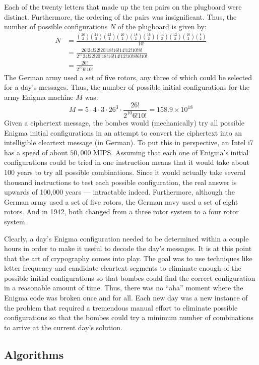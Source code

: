 Each of the twenty letters that made up the ten pairs on the plugboard were distinct.  Furthermore, the ordering of
the pairs was insignificant. Thus, the number of possible configurations \(N\) of the plugboard is given by:
\begin{align*}
  N &= \frac{\binom{26}{2}\binom{24}{2}\binom{22}{2}\binom{20}{2}\binom{18}{2}
  \binom{16}{2}\binom{14}{2}\binom{12}{2}\binom{10}{2}\binom{8}{2}}{10!} \\
  &=\frac{26!24!22!20!18!16!14!12!10!8!}{2^{10}24!22!20!18!16!14!12!10!8!6!10!} \\
  &=\frac{26!}{2^{10}6!10!}
\end{align*}
The German army used a set of five rotors, any three of which could be selected for a day's messages.  Thus, the
number of possible initial configurations for the army Enigma machine \(M\) was:
\[M=5\cdot4\cdot3\cdot26^3\cdot\frac{26!}{2^{10}6!10!}=158.9\times10^{18}\]
Given a ciphertext message, the bombes would (mechanically) try all possible Enigma initial configurations in an
attempt to convert the ciphertext into an intelligible cleartext message (in German).  To put this in perspective,
an Intel i7 has a speed of about \(50,000\) MIPS.  Assuming that each one of Enigma's initial configurations could
be tried in one instruction means that it would take about 100 years to try all possible combinations.  Since it
would actually take several thousand instructions to test each possible configuration, the real answer is upwards
of 100,000 years --- intractable indeed.  Furthermore, although the German army used a set of five rotors, the German
navy used a set of eight rotors.  And in 1942, both changed from a three rotor system to a four rotor system.

Clearly, a day's Enigma configuration needed to be determined within a couple hours in order to make it useful to
decode the day's messages.  It is at this point that the art of crypography comes into play.  The goal was to use
techniques like letter frequency and candidate cleartext segments to eliminate enough of the possible initial
configurations so that bombes could find the correct configuration in a reasonable amount of time.  Thus, there was
no ``aha'' moment where the Enigma code was broken once and for all.  Each new day was a new instance of the
problem that required a tremendous manual effort to eliminate possible configurations so that the bombes could try
a minimum number of combinations to arrive at the current day's solution.

\subsection{Algorithms}\label{sec:sub:algorithms}

